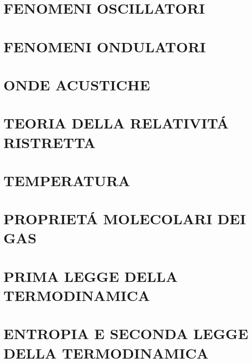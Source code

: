 \documentclass{article}
\begin{document}
	\section{FENOMENI OSCILLATORI}
	\section{FENOMENI ONDULATORI}
	\section{ONDE ACUSTICHE}
	\section{TEORIA DELLA RELATIVIT\'A RISTRETTA}
	\section{TEMPERATURA}
	\section{PROPRIET\'A MOLECOLARI DEI GAS}
	\section{PRIMA LEGGE DELLA TERMODINAMICA}
	\section{ENTROPIA E SECONDA LEGGE DELLA TERMODINAMICA}
\end{document}
